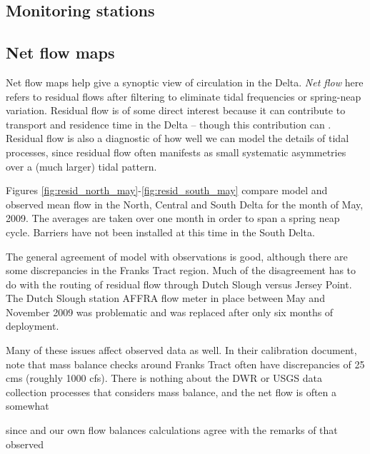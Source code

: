   \subsection{Monitoring stations}
	\subsection{Net flow maps} Net flow maps help give a synoptic view of circulation in the Delta. 
	{\em Net flow} here refers to residual flows after filtering to eliminate tidal frequencies 
	or spring-neap variation. Residual flow is of some direct interest because it can contribute 
	to transport and residence time in the Delta -- though this contribution can . 
	Residual flow is also a diagnostic of how well we can model the details of tidal processes,
	since residual flow often manifests as small systematic asymmetries over a (much larger) tidal pattern. 
	
Figures \ref{fig:resid_north_may}-\ref{fig:resid_south_may} compare model and observed mean flow in the North, Central and South Delta for the month of May, 2009. The averages are taken over one month in order to span a spring neap cycle. Barriers have not been installed at this time in the South Delta.

  The general agreement of model with observations is good, although there are some discrepancies
	in the Franks Tract region. Much of the disagreement has to do
	with the routing of residual flow through Dutch Slough versus Jersey Point. The Dutch Slough
	station AFFRA flow meter in place between May and November 2009 was problematic and was replaced 
	after only six months of deployment.
	
	Many of these issues affect observed data as well. In their calibration document, \cite{RMA05} 
	note that mass balance checks around Franks Tract often have discrepancies of 25 cms (roughly 1000 cfs).
	There is nothing about the DWR or USGS data collection processes that considers mass balance, and the 
	net flow is often a somewhat 
	
	
	since 
	and our
	own flow balances calculations agree with the remarks of \cite{RMA05} that observed 
	
